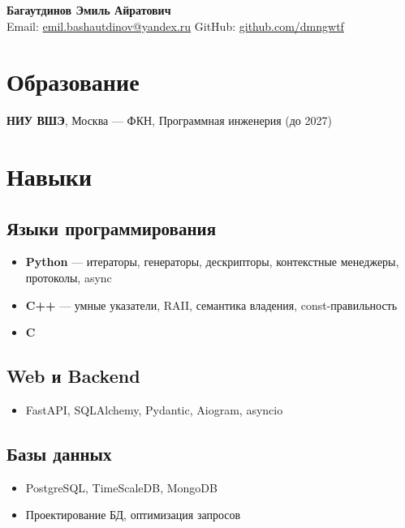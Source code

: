 \documentclass[a4paper,11pt]{article}
\begin{document}
	
	\begin{center}
		\Large\textbf{Багаутдинов Эмиль Айратович} \\[3pt]
		\normalsize
		Email: \href{mailto:emil.bashautdinov@yandex.ru}{emil.bashautdinov@yandex.ru} \quad
		GitHub: \href{https://github.com/dmngwtf}{github.com/dmngwtf}
	\end{center}
	
	\vspace{4pt}
	
	\section*{Образование}
	\textbf{НИУ ВШЭ}, Москва — ФКН, Программная инженерия (до 2027)
	
	\section*{Навыки}
	
	\subsection*{Языки программирования}
	\begin{itemize}
		\item \textbf{Python} — итераторы, генераторы, дескрипторы, контекстные менеджеры, протоколы, async
		\item \textbf{C++} — умные указатели, RAII, семантика владения, const-правильность
		\item \textbf{C}
	\end{itemize}
	
	\subsection*{Web и Backend}
	\begin{itemize}
		\item FastAPI, SQLAlchemy, Pydantic, Aiogram, asyncio
	\end{itemize}
	
	\subsection*{Базы данных}
	\begin{itemize}
		\item PostgreSQL, TimeScaleDB, MongoDB
		\item Проектирование БД, оптимизация запросов
	\end{itemize}
	
\end{document}
